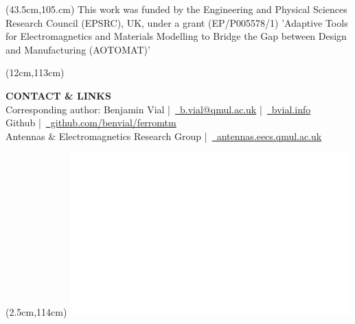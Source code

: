 \documentclass[final,12pt]{beamer} %
\begin{document}
\begin{frame}
\begin{textblock*}{38.5cm}(43.5cm,105.cm)
\color{fresnelblack}
This work was funded by the Engineering and Physical Sciences Research
Council (EPSRC), UK, under a grant (EP/P005578/1) 'Adaptive Tools for
Electromagnetics and Materials Modelling to Bridge the Gap between
Design and Manufacturing (AOTOMAT)'
\end{textblock*}
%

\begin{textblock*}{70cm}(12cm,113cm)

{\hfill\semiboldfont \bfseries \color{fresnelorange} \Large CONTACT \& LINKS}\\
\vspace*{0.5em}
\color{white}
\hfill Corresponding author: Benjamin Vial |~\textcolor{fresnelorange}{\href{mailto:b.vial@qmul.ac.uk}{\faEnvelope~b.vial@qmul.ac.uk}}
|~\textcolor{fresnelorange}{\href{http://bvial.info}{\faExternalLink~bvial.info}}\\
\hfill Github |~\textcolor{fresnelorange}{\href{https://github.com/benvial/ferromtm}{\faGithub~github.com/benvial/ferromtm}}\\
\hfill Antennas \& Electromagnetics Research Group |~\textcolor{fresnelorange}{\href{http://antennas.eecs.qmul.ac.uk}{\faExternalLink~antennas.eecs.qmul.ac.uk}}

\end{textblock*}


\begin{textblock*}{5.5cm}(2.5cm,114cm)
 \includegraphics[width=\columnwidth]{./logos/logo_epsrc.png}
\end{textblock*}


\end{frame}
\end{document}

